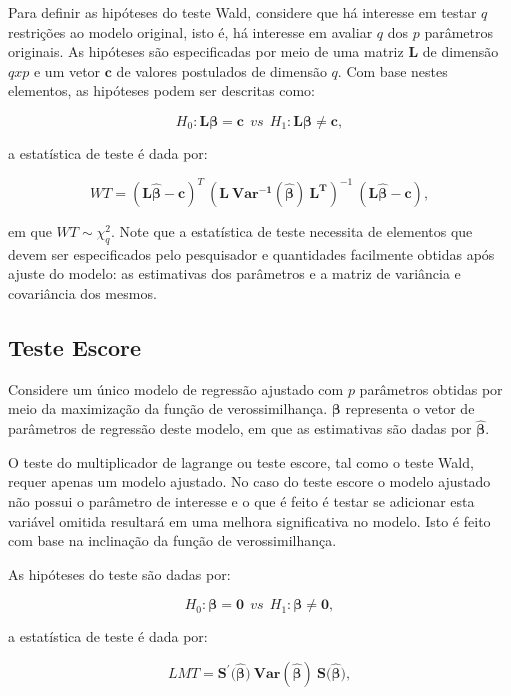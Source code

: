 Para definir as hipóteses do teste Wald, considere que há interesse em testar $q$ restrições ao modelo original, isto é, há interesse em avaliar $q$ dos $p$ parâmetros originais. As hipóteses são especificadas por meio de uma matriz $\boldsymbol{L}$ de dimensão $qxp$ e um vetor $\boldsymbol{c}$ de valores postulados de dimensão $q$. Com base nestes elementos, as hipóteses podem ser descritas como:

$$
H_0: \boldsymbol{L}\boldsymbol{\beta} = \boldsymbol{c} \: \:  vs \: \:  H_1: \boldsymbol{L}\boldsymbol{\beta} \neq \boldsymbol{c},
$$

\noindent a estatística de teste é dada por:

$$
WT = (\boldsymbol{L\hat\beta} - \boldsymbol{c})^T \ (\boldsymbol{L \ Var^{-1}(\hat\beta) \ L^T})^{-1} \ (\boldsymbol{L\hat\beta} - \boldsymbol{c}),
$$

\noindent em que $WT \sim \chi^2_q$. Note que a estatística de teste necessita de elementos que devem ser especificados pelo pesquisador e quantidades facilmente obtidas após ajuste do modelo: as estimativas dos parâmetros e a matriz de variância e covariância dos mesmos.

\subsection{Teste Escore}

Considere um único modelo de regressão ajustado com $p$ parâmetros obtidas por meio da maximização da função de verossimilhança. $\boldsymbol{\beta}$ representa o vetor de parâmetros de regressão deste modelo, em que as estimativas são dadas por $\boldsymbol{\hat\beta}$.

O teste do multiplicador de lagrange ou teste escore, tal como o teste Wald, requer apenas um modelo ajustado. No caso do teste escore o modelo ajustado não possui o parâmetro de interesse e o que é feito é testar se adicionar esta variável omitida resultará em uma melhora significativa no modelo. Isto é feito com base na inclinação da função de verossimilhança.

As hipóteses do teste são dadas por:

$$
H_0: \boldsymbol{\beta} = \boldsymbol{0} \: \: vs \: \: H_1: \boldsymbol{\beta} \neq \boldsymbol{0},
$$

\noindent a estatística de teste é dada por:

$$ LMT = \boldsymbol{S^{'}(\hat\beta}) \ \boldsymbol{Var(\hat\beta)} \ \boldsymbol{S(\hat\beta}),$$

